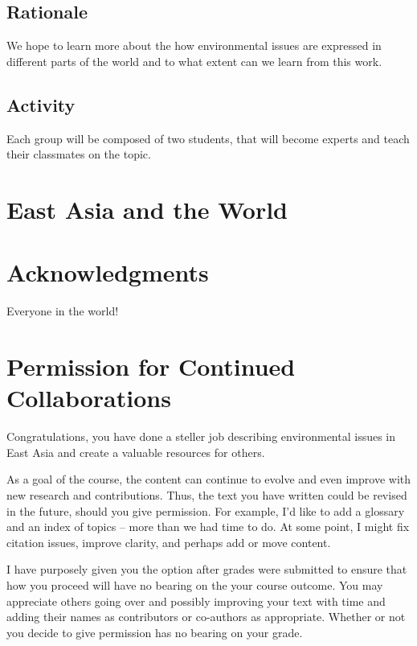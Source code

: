 \documentclass{book}\usepackage{knitr}
\begin{document}
\subsection*{Rationale}

We hope to learn more about the how environmental issues are expressed in different parts of the world and to what extent can we learn from this work. 

\subsection*{Activity}

Each group will be composed of two students, that will become experts and teach their classmates on the topic. 

\section*{East Asia and the World}







\section*{Acknowledgments}

Everyone in the world!




\newpage

\section*{Permission for Continued Collaborations}

Congratulations, you have done a steller job describing environmental issues in East Asia and create a valuable resources for others. 

As a goal of the course, the content can continue to evolve and even improve with new research and contributions. Thus, the text you have written could be revised in the future, should you give permission. For example, I'd like to add a glossary and an index of topics -- more than we had time to do. At some point, I might fix citation issues, improve clarity, and perhaps add or move content. 

I have purposely given you the option after grades were submitted to ensure that how you proceed will have no bearing on the your course outcome. You may appreciate others going over and possibly improving your text with time and adding their names as contributors or co-authors as appropriate. Whether or not you decide to give permission has no bearing on your grade.
\end{document}
